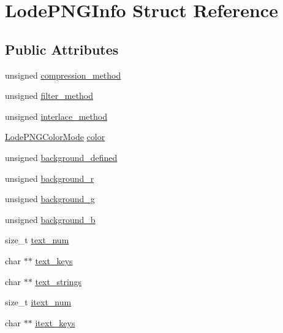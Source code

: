 \hypertarget{struct_lode_p_n_g_info}{}\section{Lode\+P\+N\+G\+Info Struct Reference}
\label{struct_lode_p_n_g_info}
\subsection*{Public Attributes}
\begin{DoxyCompactItemize}
\item 
unsigned \mbox{\hyperlink{struct_lode_p_n_g_info_a42bcacd0dbaaea01c04cc87b58ac3c1d}{compression\+\_\+method}}
\item 
unsigned \mbox{\hyperlink{struct_lode_p_n_g_info_a5098d6e8aa528d5197f51914439633b9}{filter\+\_\+method}}
\item 
unsigned \mbox{\hyperlink{struct_lode_p_n_g_info_a80207e3e53c959b2285636496a3dd3f1}{interlace\+\_\+method}}
\item 
\mbox{\hyperlink{struct_lode_p_n_g_color_mode}{Lode\+P\+N\+G\+Color\+Mode}} \mbox{\hyperlink{struct_lode_p_n_g_info_a0af9bab3435084780ce8c1cb69bb2628}{color}}
\item 
unsigned \mbox{\hyperlink{struct_lode_p_n_g_info_aa94c65344af02472adb9c71eae2e765f}{background\+\_\+defined}}
\item 
unsigned \mbox{\hyperlink{struct_lode_p_n_g_info_a98b59c3760bda184bb16c9713b430bc3}{background\+\_\+r}}
\item 
unsigned \mbox{\hyperlink{struct_lode_p_n_g_info_abf638e191edaeaa2b02c371a381e3a89}{background\+\_\+g}}
\item 
unsigned \mbox{\hyperlink{struct_lode_p_n_g_info_a994de0c74ef1092f056ff534e00dfa0d}{background\+\_\+b}}
\item 
size\+\_\+t \mbox{\hyperlink{struct_lode_p_n_g_info_a393e0b3948ca6674232e1cc625db282e}{text\+\_\+num}}
\item 
char $\ast$$\ast$ \mbox{\hyperlink{struct_lode_p_n_g_info_a0a26147c9673870dd122693f17a69b13}{text\+\_\+keys}}
\item 
char $\ast$$\ast$ \mbox{\hyperlink{struct_lode_p_n_g_info_aac321d27e65c54e56d6092d3a6400a81}{text\+\_\+strings}}
\item 
size\+\_\+t \mbox{\hyperlink{struct_lode_p_n_g_info_a22166bb10c89a4d80e206d6c4736b625}{itext\+\_\+num}}
\item 
char $\ast$$\ast$ \mbox{\hyperlink{struct_lode_p_n_g_info_a1b909e03596abf86d564641741b0087f}{itext\+\_\+keys}}
$$
\end{DoxyCompactItemize}
